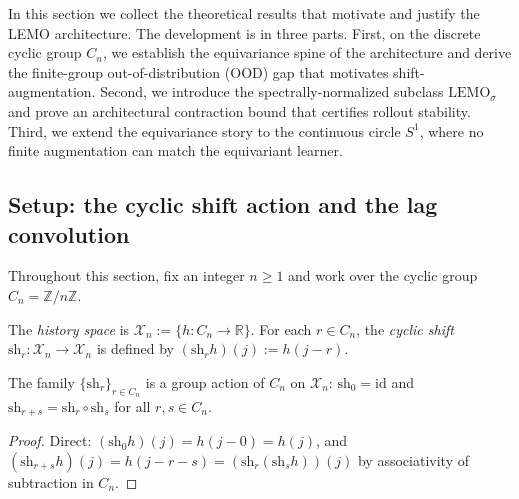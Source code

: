 
In this section we collect the theoretical results that motivate
and justify the LEMO architecture.  The development is in three
parts.  First, on the discrete cyclic group $C_n$, we establish the
equivariance spine of the architecture and derive the finite-group
out-of-distribution (OOD) gap that motivates shift-augmentation.
Second, we introduce the spectrally-normalized subclass $\mathrm{LEMO}_\sigma$
and prove an architectural contraction bound that certifies rollout
stability.  Third, we extend the equivariance story to the continuous
circle $S^1$, where no finite augmentation can match the equivariant
learner.

\subsection{Setup: the cyclic shift action and the lag convolution}

Throughout this section, fix an integer $n \ge 1$ and work over the
cyclic group $C_n = \mathbb{Z}/n\mathbb{Z}$.

\begin{definition}
\label{def:shift}
The \emph{history space} is $\mathcal{X}_n := \{h : C_n \to \mathbb{R}\}$.
For each $r \in C_n$, the \emph{cyclic shift} $\mathrm{sh}_r : \mathcal{X}_n \to \mathcal{X}_n$
is defined by $(\mathrm{sh}_r h)(j) := h(j - r)$.
\end{definition}

\begin{theorem}
\label{thm:shift-action}
The family $\{\mathrm{sh}_r\}_{r \in C_n}$ is a group action of $C_n$ on
$\mathcal{X}_n$: $\mathrm{sh}_0 = \mathrm{id}$ and $\mathrm{sh}_{r+s} = \mathrm{sh}_r \circ \mathrm{sh}_s$ for all
$r, s \in C_n$.
\end{theorem}

\begin{proof}
Direct: $(\mathrm{sh}_0 h)(j) = h(j - 0) = h(j)$, and
$(\mathrm{sh}_{r+s} h)(j) = h(j - r - s) = (\mathrm{sh}_r (\mathrm{sh}_s h))(j)$ by
associativity of subtraction in $C_n$.
\end{proof}

